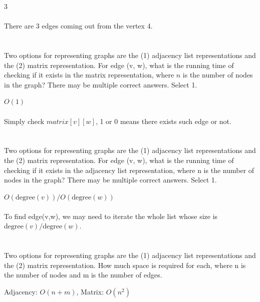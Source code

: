 \documentclass [12pt]{article}
\begin{document}
\begin{Solution}
3
\paragraph{}
There are 3 edges coming out from the vertex 4.
\end{Solution}


\section{} Two options for representing graphs are the (1) adjacency list representations and the (2) matrix representation. For edge (v, w), what is the running time of checking if it exists in the matrix representation, where $n$ is the number of nodes in the graph? There may be multiple correct answers. Select 1.

\begin{Solution}
$O(1)$
\paragraph{}
Simply check $matrix[v][w]$, 1 or 0 means there exists such edge or not. 
\end{Solution}


\section{} Two options for representing graphs are the (1) adjacency list representations and the (2) matrix representation. For edge (v, w), what is the running time of checking if it exists in the adjacency list representation, where n is the number of nodes in the graph? There may be multiple correct answers. Select 1.

\begin{Solution}
$O(\text{degree}(v)) / O(\text{degree}(w))$
\paragraph{}
To find edge(v,w), we may need to iterate the whole list whose size is $\text{degree}(v)/\text{degree}(w)$.
\end{Solution}


\section{} Two options for representing graphs are the (1) adjacency list representations and the (2) matrix representation. How much space is required for each, where n is the number of nodes and m is the number of edges. 

\begin{Solution}
Adjacency: $O(n+m)$, Matrix: $O(n^2)$
\end{Solution}
\end{document}
